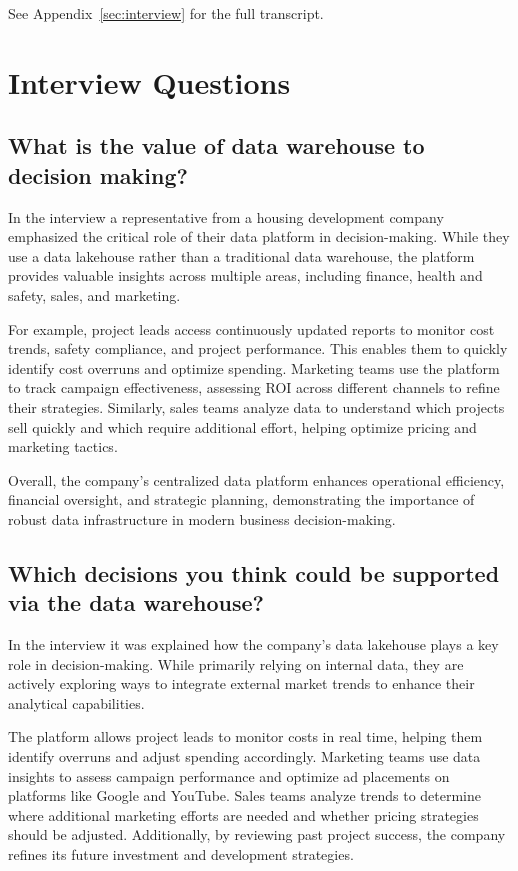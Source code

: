 See Appendix~\ref{sec:interview} for the full transcript.
\section{Interview Questions}

\subsection{What is the value of data warehouse to decision making?}

In the interview a representative from a housing development company emphasized the critical role of their data platform 
in decision-making. While they use a data lakehouse rather than a traditional data warehouse, the platform provides valuable 
insights across multiple areas, including finance, health and safety, sales, and marketing.

For example, project leads access continuously updated reports to monitor cost trends, safety compliance, and project performance. 
This enables them to quickly identify cost overruns and optimize spending. Marketing teams use the platform to track campaign 
effectiveness, assessing ROI across different channels to refine their strategies. Similarly, sales teams analyze data to understand 
which projects sell quickly and which require additional effort, helping optimize pricing and marketing tactics.

Overall, the company's centralized data platform enhances operational efficiency, financial oversight, and strategic planning, 
demonstrating the importance of robust data infrastructure in modern business decision-making.

\subsection{Which decisions you think could be supported via the data warehouse?}

In the interview it was explained how the company's data lakehouse plays a key role in decision-making. While primarily relying on 
internal data, they are actively exploring ways to integrate external market trends to enhance their analytical capabilities.

The platform allows project leads to monitor costs in real time, helping them identify overruns and adjust spending accordingly. 
Marketing teams use data insights to assess campaign performance and optimize ad placements on platforms like Google and YouTube. 
Sales teams analyze trends to determine where additional marketing efforts are needed and whether pricing strategies should be adjusted. 
Additionally, by reviewing past project success, the company refines its future investment and development strategies.

